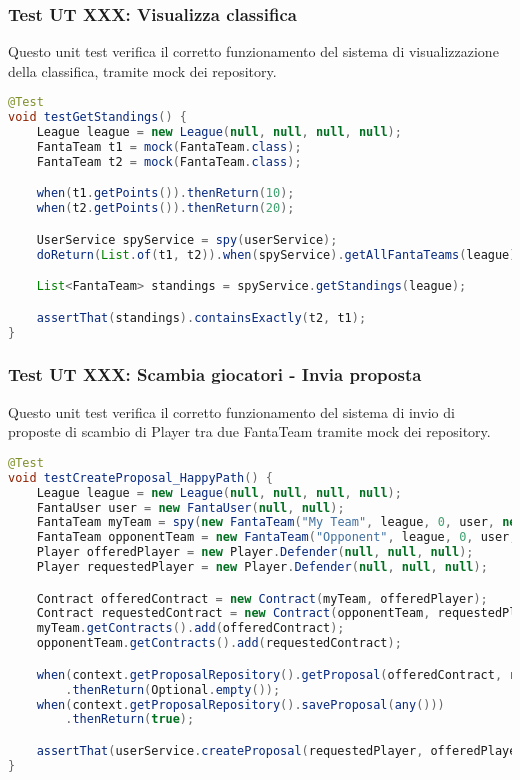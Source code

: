 \subsubsection{Test UT XXX: Visualizza classifica} \label{UT11}

Questo unit test verifica il corretto funzionamento del sistema di visualizzazione della classifica,
tramite mock dei repository.

\begin{lstlisting}[language=Java]
@Test
void testGetStandings() {
	League league = new League(null, null, null, null);
	FantaTeam t1 = mock(FantaTeam.class);
	FantaTeam t2 = mock(FantaTeam.class);

	when(t1.getPoints()).thenReturn(10);
	when(t2.getPoints()).thenReturn(20);

	UserService spyService = spy(userService);
	doReturn(List.of(t1, t2)).when(spyService).getAllFantaTeams(league);

	List<FantaTeam> standings = spyService.getStandings(league);

	assertThat(standings).containsExactly(t2, t1);
}
\end{lstlisting}


\subsubsection{Test UT XXX: Scambia giocatori - Invia proposta} \label{UT12}

Questo unit test verifica il corretto funzionamento del sistema di invio di proposte di scambio di Player tra due FantaTeam
tramite mock dei repository.

\begin{lstlisting}[language=Java]
@Test
void testCreateProposal_HappyPath() {
	League league = new League(null, null, null, null);
	FantaUser user = new FantaUser(null, null);
	FantaTeam myTeam = spy(new FantaTeam("My Team", league, 0, user, new HashSet<>()));
	FantaTeam opponentTeam = new FantaTeam("Opponent", league, 0, user, new HashSet<>());
	Player offeredPlayer = new Player.Defender(null, null, null);
	Player requestedPlayer = new Player.Defender(null, null, null);

	Contract offeredContract = new Contract(myTeam, offeredPlayer);
	Contract requestedContract = new Contract(opponentTeam, requestedPlayer);
	myTeam.getContracts().add(offeredContract);
	opponentTeam.getContracts().add(requestedContract);

	when(context.getProposalRepository().getProposal(offeredContract, requestedContract))
		.thenReturn(Optional.empty());
	when(context.getProposalRepository().saveProposal(any()))
        .thenReturn(true);

	assertThat(userService.createProposal(requestedPlayer, offeredPlayer, myTeam, opponentTeam)).isTrue();
}
\end{lstlisting}


